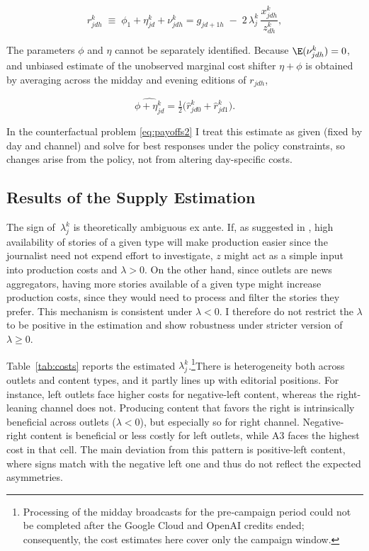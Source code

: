 \documentclass[12pt]{article}
\begin{document}
	\[
	r_{jdh}^k \;\equiv\;\phi_1+\eta_{jd}^k+ \nu_{jdh}^k= {{g}_{jd+1h}} \;-\; 2\,{{\lambda}}_j^k\,\frac{x_{jdh}^k}{z_{dh}^k} ,
	\]
	
	
	The parameters $\phi$ and $\eta$ cannot be separately identified. Because $\E(\nu_{jdh}^k)=0$, and unbiased estimate of the unobserved marginal cost shifter $\eta + \phi$ is obtained by averaging across the midday and evening editions of $r_{jdh}$,
	
	
	\[
	\widehat{\phi +\eta_{jd}^k} = \tfrac{1}{2}\big(\hat{r}_{jd0}^k+\hat{r}_{jd1}^k\big).
	\]
	
	
	In the counterfactual problem \eqref{eq:payoffs2} I treat this estimate  as given (fixed by day and channel) and solve for best responses under the policy constraints, so changes arise from the policy, not from altering day-specific costs.
	
	
	
	\subsection{Results of the Supply Estimation}
	
	The sign of~$\lambda_j^k$ is theoretically ambiguous ex ante. If, as suggested in \cite{SimonovRao2022}, high availability of stories of a given type will make production easier since the journalist need not expend effort to investigate,  $z$ might act as a simple input into production costs and $ \lambda>0$. On the other hand, since outlets are news aggregators, having more stories available of a given type might increase production costs, since they would need to process and filter the stories they prefer. This mechanism is consistent under $ \lambda<0$. I therefore do not restrict the $\lambda$ to be positive in the estimation and show robustness under stricter version of $\lambda \geq0$.
	
	
	Table~\ref{tab:costs} reports the estimated $\lambda_j^k$.\footnote{Processing of the midday broadcasts for the pre‑campaign period could not be completed after the Google Cloud and OpenAI credits ended; consequently, the cost estimates here cover only the campaign window. }There is heterogeneity both  across outlets and content types, and it partly lines up with editorial positions. For instance, left outlets face higher costs for negative-left content, whereas the right-leaning channel does not. Producing content that favors the right is intrinsically beneficial across outlets ($\lambda<0$), but especially so for right channel. Negative-right content is beneficial or less costly for left outlets, while A3 faces the highest cost in that cell. The main deviation from this pattern is positive-left content, where signs match with the negative left one and thus do not reflect the expected asymmetries. 
	
\end{document}

